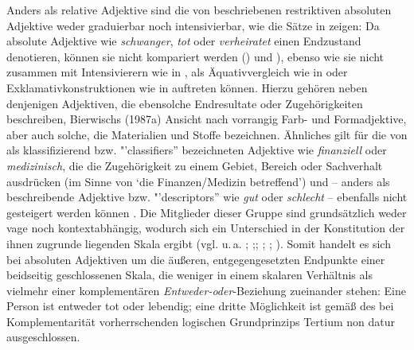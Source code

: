 Anders als relative Adjektive sind die von \citet[14]{Bierwisch.1987a} beschriebenen restriktiven absoluten Adjektive weder graduierbar noch intensivierbar, wie die Sätze in  zeigen: Da absolute Adjektive wie \textit{schwanger}, \textit{tot} oder \textit{verheiratet} einen Endzustand denotieren, können sie nicht kompariert werden () und ), ebenso wie sie nicht zusammen mit Intensivierern wie in , als Äquativvergleich wie in  oder Exklamativkonstruktionen wie in  auftreten können. Hierzu gehören neben denjenigen Adjektiven, die ebensolche Endresultate oder Zugehörigkeiten beschreiben, Bierwischs (1987a) Ansicht nach vorrangig Farb- und Formadjektive, aber auch solche, die Materialien und Stoffe bezeichnen. Ähnliches gilt für die von \citet[506]{Biber.1999} als klassifizierend bzw. "'classifiers'' bezeichneten Adjektive wie \textit{finanziell} oder \textit{medizinisch}, die die Zugehörigkeit zu einem Gebiet, Bereich oder Sachverhalt ausdrücken (im Sinne von `die Finanzen/Medizin betreffend') und -- anders als beschreibende Adjektive bzw. "'descriptors'' wie \textit{gut} oder \textit{schlecht} -- ebenfalls nicht gesteigert werden können \citep[vgl.][68]{Stratton.2022b}. Die Mitglieder dieser Gruppe sind grundsätzlich weder vage noch kontextabhängig, wodurch sich ein Unterschied in der Konstitution der ihnen zugrunde liegenden Skala ergibt (vgl. u.\,a. \citealt[9]{Bolinger.1967a}; \citealt[355ff.]{Kennedy.2005};; \citealt[410]{Breindl.2007}; \citealt[29]{Kennedy.2007}; \citealt[589]{Lassiter.2013}). Somit handelt es sich bei absoluten Adjektiven um die äußeren, entgegengesetzten Endpunkte einer beidseitig geschlossenen Skala, die weniger in einem skalaren Verhältnis als vielmehr einer komplementären \textit{Entweder-oder}-Beziehung zueinander stehen: Eine Person ist entweder tot oder lebendig; eine dritte Möglichkeit ist gemäß des bei Komplementarität vorherrschenden logischen Grundprinzips \glqq{}Tertium non datur\grqq{} ausgeschlossen.


